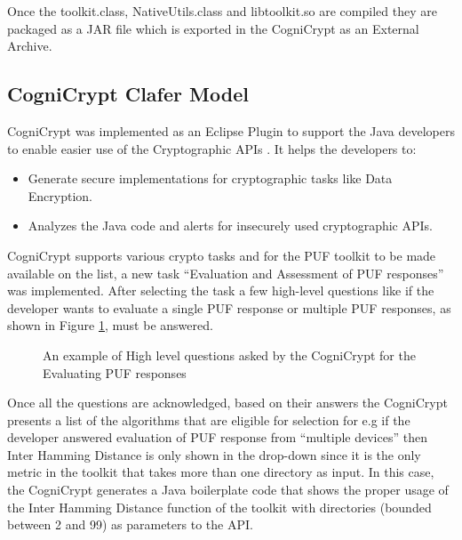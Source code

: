 Once the toolkit.class, NativeUtils.class and libtoolkit.so are compiled they are packaged as a JAR file which is exported in the CogniCrypt as an External Archive.

\subsection{CogniCrypt Clafer Model}
CogniCrypt was implemented as an Eclipse Plugin to support the Java developers to enable easier use of the Cryptographic APIs \cite{cogni}. It helps the developers to:
\begin{itemize}
	\item Generate secure implementations for cryptographic tasks like Data Encryption.
	\item Analyzes the Java code and alerts for insecurely used cryptographic APIs.
\end{itemize}

CogniCrypt supports various crypto tasks and for the PUF toolkit to be made available on the list, a new task ``Evaluation and Assessment of PUF responses'' was implemented. After selecting the task a few high-level questions like if the developer wants to evaluate a single PUF response or multiple PUF responses, as shown in Figure \ref{img:cogni_ques}, must be answered.\\

\begin{figure}[h]
\centering
{}
\caption{An example of High level questions asked by the CogniCrypt for the Evaluating PUF responses}
\label{img:cogni_ques}
\end{figure}

Once all the questions are acknowledged, based on their answers the CogniCrypt presents a list of the algorithms that are eligible for selection for e.g if the developer answered evaluation of PUF response from ``multiple devices'' then Inter Hamming Distance is only shown in the drop-down since it is the only metric in the toolkit that takes more than one directory as input. In this case, the CogniCrypt generates a Java boilerplate code that shows the proper usage of the Inter Hamming Distance
function of the toolkit with directories (bounded between 2 and 99) as parameters to the API.\\

